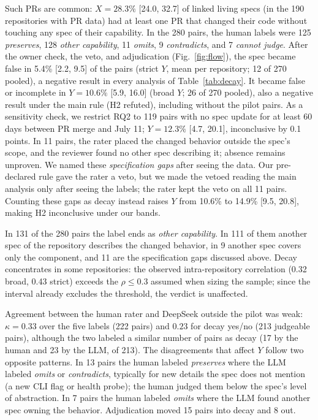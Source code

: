 \documentclass[10pt,conference]{IEEEtran}
\begin{document}
Such PRs are common: $X = 28.3\%$ [24.0, 32.7] of linked living specs (in the 190 repositories with PR data) had at least one PR that changed their code without touching any spec of their capability. In the 280 pairs, the human labels were 125 \emph{preserves}, 128 \emph{other capability}, 11 \emph{omits}, 9 \emph{contradicts}, and 7 \emph{cannot judge}. After the owner check, the veto, and adjudication (Fig.~\ref{fig:flow}), the spec became false in 5.4\% [2.2, 9.5] of the pairs (strict $Y$, mean per repository; 12 of 270 pooled), a negative result in every analysis of Table~\ref{tab:decay}. It became false or incomplete in $Y = 10.6\%$ [5.9, 16.0] (broad $Y$; 26 of 270 pooled), also a negative result under the main rule (H2 refuted), including without the pilot pairs. As a sensitivity check, we restrict RQ2 to 119 pairs with no spec update for at least 60 days between PR merge and July 11; $Y = 12.3\%$ [4.7, 20.1], inconclusive by 0.1 points. In 11 pairs, the rater placed the changed behavior outside the spec's scope, and the reviewer found no other spec describing it; absence remains unproven. We named these \emph{specification gaps} after seeing the data. Our pre-declared rule gave the rater a veto, but we made the vetoed reading the main analysis only after seeing the labels; the rater kept the veto on all 11 pairs. Counting these gaps as decay instead raises $Y$ from 10.6\% to 14.9\% [9.5, 20.8], making H2 inconclusive under our bands.

In 131 of the 280 pairs the label ends as \emph{other capability}. In 111 of them another spec of the repository describes the changed behavior, in 9 another spec covers only the component, and 11 are the specification gaps discussed above. Decay concentrates in some repositories: the observed intra-repository correlation (0.32 broad, 0.43 strict) exceeds the $\rho \le 0.3$ assumed when sizing the sample; since the interval already excludes the threshold, the verdict is unaffected.

Agreement between the human rater and DeepSeek outside the pilot was weak: $\kappa = 0.33$ over the five labels (222 pairs) and $0.23$ for decay yes/no (213 judgeable pairs), although the two labeled a similar number of pairs as decay (17 by the human and 23 by the LLM, of 213). The disagreements that affect $Y$ follow two opposite patterns. In 13 pairs the human labeled \emph{preserves} where the LLM labeled \emph{omits} or \emph{contradicts}, typically for new details the spec does not mention (a new CLI flag or health probe); the human judged them below the spec's level of abstraction. In 7 pairs the human labeled \emph{omits} where the LLM found another spec owning the behavior. Adjudication moved 15 pairs into decay and 8 out.
\end{document}
